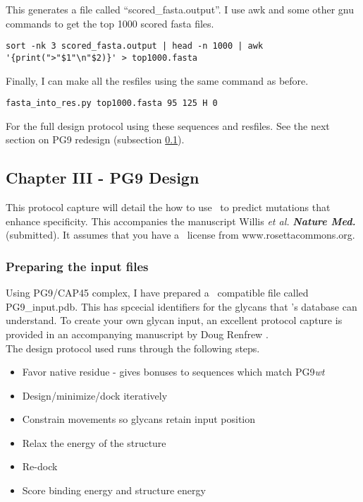 This generates a file called ``scored\_fasta.output''. I use awk and some other gnu commands to get the top 1000 scored fasta files.

\begin{lstlisting}[breaklines=true]
sort -nk 3 scored_fasta.output | head -n 1000 | awk '{print(">"$1"\n"$2)}' > top1000.fasta
\end{lstlisting}

Finally, I can make all the resfiles using the same command as before.

\begin{lstlisting}[breaklines=true]
fasta_into_res.py top1000.fasta 95 125 H 0
\end{lstlisting}

For the full design protocol using these sequences and resfiles. See the next section on PG9 redesign (subsection \ref{subsec:pg9redesign}).

\subsection{Chapter III - PG9 Design}
\label{subsec:pg9redesign}
\setlength{\parindent}{0cm}
This protocol capture will detail the how to use \rosettadesign~to predict mutations that enhance specificity. This accompanies the manuscript Willis \textit{et al.} \textbf{\textit{Nature Med.}} (submitted). It assumes that you have a \rosetta~license from www.rosettacommons.org. \\

\subsubsection{Preparing the input files}
Using PG9/CAP45 complex, I have prepared a \rosetta~compatible file called PG9\_input.pdb. This has spcecial identifiers for the glycans that \rosetta 's database can understand. To create your own glycan input, an excellent protocol capture is provided in an accompanying manuscript by Doug Renfrew \citep{Renfrew:2012ci}. \\

The design protocol used runs through the following steps.

\begin{itemize}
\item Favor native residue - gives bonuses to sequences which match PG9\textit{wt}
\item Design/minimize/dock iteratively
\item Constrain movements so glycans retain input position
\item Relax the energy of the structure
\item Re-dock
\item Score binding energy and structure energy
\end{itemize}

